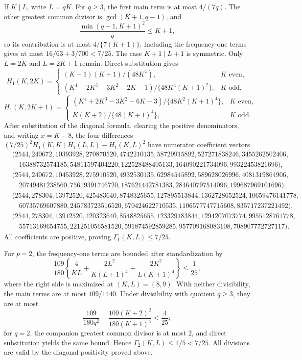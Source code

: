 If \(K\mid L\), write \(L=qK\).  For \(q\geq3\), the first main term is at most \(4/(7q)\).  The other greatest common divisor is \(\gcd(K+1,q-1)\), and
\[
 \frac{\min(q-1,K+1)^2}{q}\leq K+1,
\]
so its contribution is at most \(4/\{7(K+1)\}\).  Including the frequency-one terms gives at most \(16/63+3/700<7/25\).  The case \(K+1\mid L+1\) is symmetric.  Only \(L=2K\) and \(L=2K+1\) remain.  Direct substitution gives
\[
 H_1(K,2K)=
 \begin{cases}
 (K-1)(K+1)/(48K^4),&K\text{ even},\\
 (K^4+2K^3-3K^2-2K-1)/\{48K^4(K+1)^2\},&K\text{ odd},
 \end{cases}
\]
\[
 H_1(K,2K+1)=
 \begin{cases}
 (K^4+2K^3-3K^2-6K-3)/\{48K^2(K+1)^4\},&K\text{ even},\\
 K(K+2)/\{48(K+1)^4\},&K\text{ odd}.
 \end{cases}
\]
After substitution of the diagonal formula, clearing the positive denominators, and writing \(x=K-8\), the four differences \((7/25)^2H_1(K,K)H_1(L,L)-H_1(K,L)^2\) have numerator coefficient vectors
\[
\begin{split}
 &(2544,240672,10393928,270870520,4742210135,58729915892,527271838246,3455262502406,\\
 &\quad16388732574185,54811597404220,122528488405133,164090221734096,99322453821696),\\
 &(2544,240672,10453928,275910520,4932530135,62984545892,589628026996,4081319864906,\\
 &\quad20749481238560,75619391746720,187621442781383,284640797514096,199687969101696),\\
 &(2544,278304,13972520,425483640,8748325655,127895513844,1362728652524,10659476141778,\\
 &\quad60735769607880,245783723516520,670424622710535,1106577747715608,835717237221492),\\
 &(2544,278304,13912520,420323640,8548825655,123329183844,1294207073774,9955128761778,\\
 &\quad55713169654755,221251056581520,591874592859285,957709168083108,708907772727117).
\end{split}
\]
All coefficients are positive, proving \(\Gamma_1(K,L)\leq7/25\).

For \(p=2\), the frequency-one terms are bounded after standardization by
\[
 \frac{109}{180}\left\{\frac4{KL}
 +\frac{2L^2}{K(L+1)^4}+\frac{2K^2}{L(K+1)^4}\right\}
 \leq\frac1{25},
\]
where the right side is maximized at \((K,L)=(8,9)\).  With neither divisibility, the main terms are at most \(109/1440\).  Under divisibility with quotient \(q\geq3\), they are at most
\[
 \frac{109}{180q^2}+\frac{109(K+2)^2}{180(K+1)^4}<\frac4{25};
\]
for \(q=2\), the companion greatest common divisor is at most \(2\), and direct substitution yields the same bound.  Hence \(\Gamma_2(K,L)\leq1/5<7/25\).  All divisions are valid by the diagonal positivity proved above.

